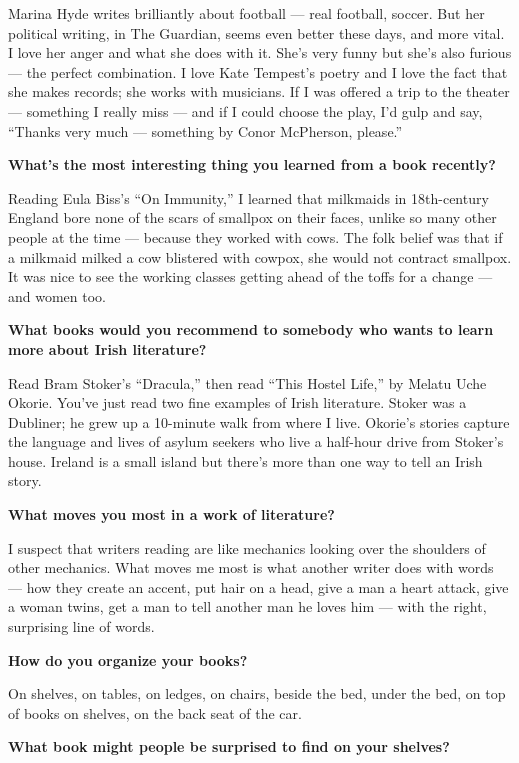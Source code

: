 Marina Hyde writes brilliantly about football --- real football, soccer.
But her political writing, in The Guardian, seems even better these
days, and more vital. I love her anger and what she does with it. She's
very funny but she's also furious --- the perfect combination. I love
Kate Tempest's poetry and I love the fact that she makes records; she
works with musicians. If I was offered a trip to the theater ---
something I really miss --- and if I could choose the play, I'd gulp and
say, ``Thanks very much --- something by Conor McPherson, please.''

\textbf{What's the most interesting thing you learned from a book
recently?}

Reading Eula Biss's ``On Immunity,'' I learned that milkmaids in
18th-century England bore none of the scars of smallpox on their faces,
unlike so many other people at the time --- because they worked with
cows. The folk belief was that if a milkmaid milked a cow blistered with
cowpox, she would not contract smallpox. It was nice to see the working
classes getting ahead of the toffs for a change --- and women too.

\textbf{What books would you recommend to somebody who wants to learn
more about Irish literature?}

Read Bram Stoker's ``Dracula,'' then read ``This Hostel Life,'' by
Melatu Uche Okorie. You've just read two fine examples of Irish
literature. Stoker was a Dubliner; he grew up a 10-minute walk from
where I live. Okorie's stories capture the language and lives of asylum
seekers who live a half-hour drive from Stoker's house. Ireland is a
small island but there's more than one way to tell an Irish story.

\textbf{What moves you most in a work of literature?}

I suspect that writers reading are like mechanics looking over the
shoulders of other mechanics. What moves me most is what another writer
does with words --- how they create an accent, put hair on a head, give
a man a heart attack, give a woman twins, get a man to tell another man
he loves him --- with the right, surprising line of words.

\textbf{How do you organize your books?}

On shelves, on tables, on ledges, on chairs, beside the bed, under the
bed, on top of books on shelves, on the back seat of the car.

\textbf{What book might people be surprised to find on your shelves?}


